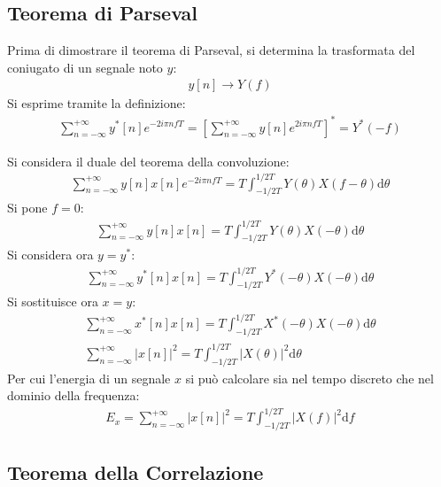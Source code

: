 \documentclass{article}
\newcommand{\df}{\mathrm{d}}
\numberwithin{equation}{subsection}
\begin{document}
\subsection{Teorema di Parseval}

Prima di dimostrare il teorema di Parseval, si determina la trasformata del coniugato di un segnale noto $y$:
\begin{gather*}
    y[n]\to Y(f)
\end{gather*}
Si esprime tramite la definizione:
\begin{gather*}
    \displaystyle\sum_{n=-\infty}^{+\infty}y^*[n]e^{-2i\pi nfT}=\left[\sum_{n=-\infty}^{+\infty}y[n]e^{2i\pi nfT}\right]^*=Y^*(-f)
\end{gather*}

Si considera il duale del teorema della convoluzione:
\begin{gather*}
    \displaystyle\sum_{n=-\infty}^{+\infty}y[n]x[n]e^{-2i\pi nfT}=T\displaystyle\int_{-1/2T}^{1/2T}Y(\theta)X(f-\theta)\df\theta
\end{gather*}
Si pone $f=0$:
\begin{gather*}
    \displaystyle\sum_{n=-\infty}^{+\infty}y[n]x[n]=T\displaystyle\int_{-1/2T}^{1/2T}Y(\theta)X(-\theta)\df\theta
\end{gather*}
Si considera ora $y=y^*$:
\begin{gather*}
    \displaystyle\sum_{n=-\infty}^{+\infty}y^*[n]x[n]=T\displaystyle\int_{-1/2T}^{1/2T}Y^*(-\theta)X(-\theta)\df\theta
\end{gather*}
Si sostituisce ora $x=y$:
\begin{gather*}
    \displaystyle\sum_{n=-\infty}^{+\infty}x^*[n]x[n]=T\displaystyle\int_{-1/2T}^{1/2T}X^*(-\theta)X(-\theta)\df\theta\\
    \displaystyle\sum_{n=-\infty}^{+\infty}|x[n]|^2=T\int_{-1/2T}^{1/2T}|X(\theta)|^2\df\theta
\end{gather*}
Per cui l'energia di un segnale $x$ si può calcolare sia nel tempo discreto che nel dominio della frequenza:
\begin{gather}
    E_x=\displaystyle\sum_{n=-\infty}^{+\infty}|x[n]|^2=T\int_{-1/2T}^{1/2T}|X(f)|^2\df f
\end{gather}

\subsection{Teorema della Correlazione}
\end{document}
